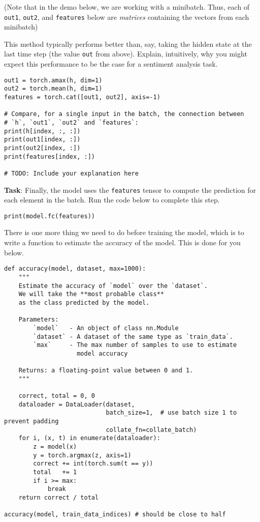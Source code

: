 \documentclass[
  letterpaper,
  DIV=11,
  numbers=noendperiod]{scrartcl}
\begin{document}
(Note that in the demo below, we are working with a minibatch. Thus,
each of \texttt{out1}, \texttt{out2}, and \texttt{features} below are
\emph{matrices} containing the vectors from each minibatch)

This method typically performs better than, say, taking the hidden state
at the last time step (the value \texttt{out} from above). Explain,
intuitively, why you might expect this performance to be the case for a
sentiment analysis task.

\begin{verbatim}
out1 = torch.amax(h, dim=1)
out2 = torch.mean(h, dim=1)
features = torch.cat([out1, out2], axis=-1)

# Compare, for a single input in the batch, the connection between
# `h`, `out1`, `out2` and `features`:
print(h[index, :, :])
print(out1[index, :])
print(out2[index, :])
print(features[index, :])

# TODO: Include your explanation here
\end{verbatim}

\textbf{Task}: Finally, the model uses the \texttt{features} tensor to
compute the prediction for each element in the batch. Run the code below
to complete this step.

\begin{verbatim}
print(model.fc(features))
\end{verbatim}

There is one more thing we need to do before training the model, which
is to write a function to estimate the accuracy of the model. This is
done for you below.

\begin{verbatim}
def accuracy(model, dataset, max=1000):
    """
    Estimate the accuracy of `model` over the `dataset`.
    We will take the **most probable class**
    as the class predicted by the model.

    Parameters:
        `model`   - An object of class nn.Module
        `dataset` - A dataset of the same type as `train_data`.
        `max`     - The max number of samples to use to estimate 
                    model accuracy

    Returns: a floating-point value between 0 and 1.
    """

    correct, total = 0, 0
    dataloader = DataLoader(dataset,
                            batch_size=1,  # use batch size 1 to prevent padding
                            collate_fn=collate_batch)
    for i, (x, t) in enumerate(dataloader):
        z = model(x)
        y = torch.argmax(z, axis=1)
        correct += int(torch.sum(t == y))
        total   += 1
        if i >= max:
            break
    return correct / total

accuracy(model, train_data_indices) # should be close to half
\end{verbatim}
\end{document}
